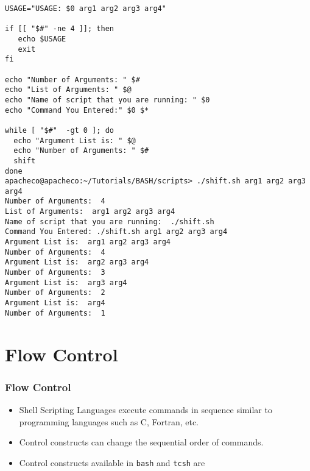 \documentclass[slidestop,mathserif,compress,xcolor=svgnames]{beamer}
\begin{document}
\begin{frame}
{\begin{verbatim}
USAGE="USAGE: $0 arg1 arg2 arg3 arg4"

if [[ "$#" -ne 4 ]]; then
   echo $USAGE
   exit
fi

echo "Number of Arguments: " $#
echo "List of Arguments: " $@
echo "Name of script that you are running: " $0
echo "Command You Entered:" $0 $*

while [ "$#"  -gt 0 ]; do
  echo "Argument List is: " $@
  echo "Number of Arguments: " $#
  shift 
done
apacheco@apacheco:~/Tutorials/BASH/scripts> ./shift.sh arg1 arg2 arg3 arg4
Number of Arguments:  4
List of Arguments:  arg1 arg2 arg3 arg4
Name of script that you are running:  ./shift.sh
Command You Entered: ./shift.sh arg1 arg2 arg3 arg4
Argument List is:  arg1 arg2 arg3 arg4
Number of Arguments:  4
Argument List is:  arg2 arg3 arg4
Number of Arguments:  3
Argument List is:  arg3 arg4
Number of Arguments:  2
Argument List is:  arg4
Number of Arguments:  1
    \end{verbatim}
  }
\end{frame}

\section{Flow Control}
\begin{frame}
  \frametitle{\small Flow Control}
  \begin{itemize}
    \item Shell Scripting Languages execute commands in sequence similar to programming languages such as C, Fortran, etc.
    \item Control constructs can change the sequential order of commands.
    \item Control constructs available in \texttt{bash} and \texttt{tcsh} are
  \end{itemize}
\end{frame}
\end{document}
